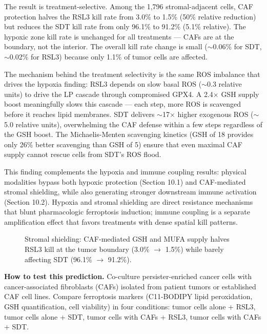\documentclass[11pt,twoside,openright]{report}
\begin{document}
The result is treatment-selective. Among the 1,796 stromal-adjacent cells, CAF protection halves the RSL3 kill rate from 3.0\% to 1.5\% (50\% relative reduction) but reduces the SDT kill rate from only 96.1\% to 91.2\% (5.1\% relative). The hypoxic zone kill rate is unchanged for all treatments --- CAFs are at the boundary, not the interior. The overall kill rate change is small ($\sim$0.06\% for SDT, $\sim$0.02\% for RSL3) because only 1.1\% of tumor cells are affected.

The mechanism behind the treatment selectivity is the same ROS imbalance that drives the hypoxia finding: RSL3 depends on slow basal ROS ($\sim$0.3 relative units) to drive the LP cascade through compromised GPX4. A 2.4$\times$ GSH supply boost meaningfully slows this cascade --- each step, more ROS is scavenged before it reaches lipid membranes. SDT delivers $\sim$17$\times$ higher exogenous ROS ($\sim$5.0 relative units), overwhelming the CAF defense within a few steps regardless of the GSH boost. The Michaelis-Menten scavenging kinetics (GSH of 18 provides only 26\% better scavenging than GSH of 5) ensure that even maximal CAF supply cannot rescue cells from SDT's ROS flood.

This finding complements the hypoxia and immune coupling results: physical modalities bypass both hypoxic protection (Section 10.1) and CAF-mediated stromal shielding, while also generating stronger downstream immune activation (Section 10.2). Hypoxia and stromal shielding are direct resistance mechanisms that blunt pharmacologic ferroptosis induction; immune coupling is a separate amplification effect that favors treatments with dense spatial kill patterns.

\begin{figure}[tbp]
\setcounter{figure}{16}
\caption{Stromal shielding: CAF-mediated GSH and MUFA supply halves RSL3 kill at the tumor boundary (3.0\% $\rightarrow$ 1.5\%) while barely affecting SDT (96.1\% $\rightarrow$ 91.2\%).}
\label{fig:fig20_stromal_shielding}
\end{figure}

\textbf{How to test this prediction.} Co-culture persister-enriched cancer cells with cancer-associated fibroblasts (CAFs) isolated from patient tumors or established CAF cell lines. Compare ferroptosis markers (C11-BODIPY lipid peroxidation, GSH quantification, cell viability) in four conditions: tumor cells alone + RSL3, tumor cells alone + SDT, tumor cells with CAFs + RSL3, tumor cells with CAFs + SDT.
\end{document}
